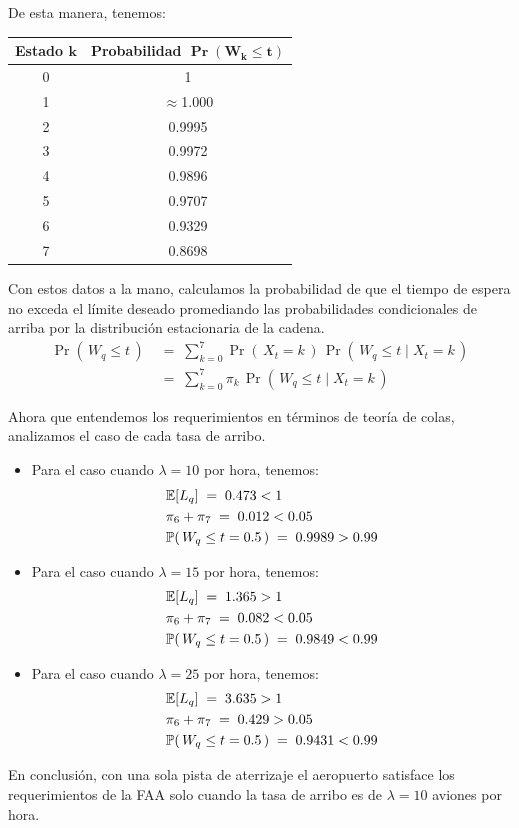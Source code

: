 \documentclass[ a4paper, twoside, 11pt]{article}
\begin{document}
\begin{problem}
\begin{enumerate}[label=\textbf{\alph*)}]
\begin{itemize}
De esta manera, tenemos: 
\begin{table}[H]
\centering
\begin{tabular}{|c|c|}
\hline
\textbf{Estado} $\boldsymbol{k}$ & \textbf{Probabilidad} $\boldsymbol{ \Pr( W_k \leq t)}$ \\ \hline
0 & 1  \\ \hline
1 & $\approx$1.000  \\ \hline
2 & 0.9995  \\ \hline
3 & 0.9972  \\ \hline
4 & 0.9896  \\ \hline
5 & 0.9707  \\ \hline
6 & 0.9329  \\ \hline
7 & 0.8698  \\ \hline
\end{tabular}
\end{table}
Con estos datos a la mano, calculamos la probabilidad de que el tiempo de espera no exceda el l\'imite deseado promediando las probabilidades condicionales de arriba por la distribuci\'on estacionaria de la cadena. \Iec
\begin{align*}
\Pr( \, W_q \leq t \, ) \;
& = \;
\sum_{k=0}^7 \Pr( \, X_t = k \, ) \,
\Pr( \, W_q \leq t \mid X_t = k \, ) \\
& = \;
\sum_{k=0}^7 \pi_k \, \Pr( \, W_q \leq t \mid X_t = k \, )
\end{align*}

\end{itemize}

Ahora que entendemos los requerimientos en t\'erminos de teor\'ia de colas, analizamos el caso de cada tasa de arribo. 
\begin{itemize}
\item Para el caso cuando $\lambda = 10$ por hora, tenemos: 
\begin{align*}
& \mathbb{E}[L_q] \; = \; 0.473 < 1 \\
& \pi_6 + \pi_7 \; = \; 0.012 < 0.05 \\
& \mathbb{P}( \, W_q \leq t = 0.5 \, ) \; = \; 0.9989 > 0.99
\end{align*}
\item Para el caso cuando $\lambda = 15$ por hora, tenemos: 
\begin{align*}
& \mathbb{E}[L_q] \; = \; 1.365 > 1 \\
& \pi_6 + \pi_7 \; = \; 0.082 < 0.05 \\
& \mathbb{P}( \, W_q \leq t = 0.5 \, ) \; = \; 0.9849 < 0.99
\end{align*}
\item Para el caso cuando $\lambda = 25$ por hora, tenemos: 
\begin{align*}
& \mathbb{E}[L_q] \; = \; 3.635 > 1 \\
& \pi_6 + \pi_7 \; = \; 0.429 > 0.05 \\
& \mathbb{P}( \, W_q \leq t = 0.5 \, ) \; = \; 0.9431 < 0.99
\end{align*}
\end{itemize}
En conclusi\'on, con una sola pista de aterrizaje el aeropuerto satisface los requerimientos de la FAA solo cuando la tasa de arribo es de $\lambda = 10$ aviones por hora. 


\end{enumerate}
\end{problem}
\end{document}
